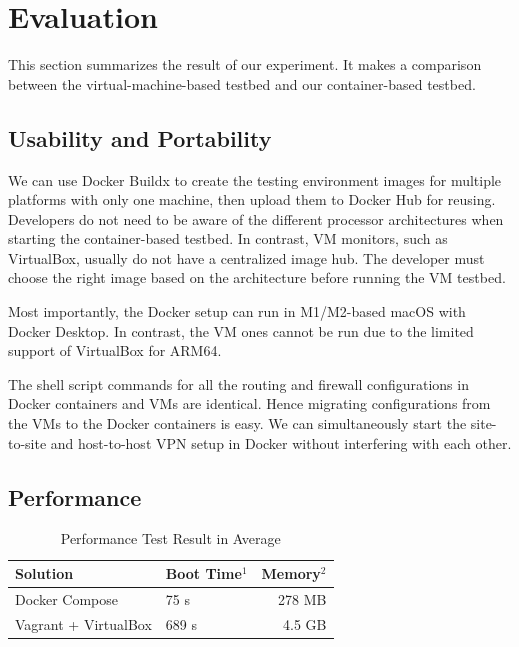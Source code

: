 \documentclass[article]{aaltoseries}
\begin{document}

\section{Evaluation}
This section summarizes the result of our experiment. It makes a comparison between the virtual-machine-based testbed and our container-based testbed.

\subsection{Usability and Portability}
We can use Docker Buildx \cite{dockermultiplatform} to create the testing environment images for multiple platforms with only one machine, then upload them to Docker Hub for reusing. Developers do not need to be aware of the different processor architectures when starting the container-based testbed. In contrast, VM monitors, such as VirtualBox, usually do not have a centralized image hub. The developer must choose the right image based on the architecture before running the VM testbed.

Most importantly, the Docker setup can run in M1/M2-based macOS with Docker Desktop. In contrast, the VM ones cannot be run due to the limited support of VirtualBox for ARM64.

The shell script commands for all the routing and firewall configurations in Docker containers and VMs are identical. Hence migrating configurations from the VMs to the Docker containers is easy. We can simultaneously start the site-to-site and host-to-host VPN setup in Docker without interfering with each other.

\subsection{Performance}
\begin{table}[t!]
  \begin{center}
    \caption{Performance Test Result in Average}
    \begin{tabular}{|l|lr|}
    \hline
    Solution               & Boot Time$^1$ & Memory$^2$ \\
    \hline
    Docker Compose         &   75 s    &  278 MB \\
    Vagrant + VirtualBox   &  689 s    &  4.5 GB \\
    \hline
    \end{tabular}
    \label{tab:result}
  \end{center}
\end{table}
\end{document}
